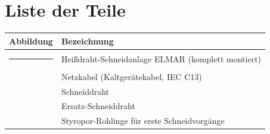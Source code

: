 %
%

\chapter{Liste der Teile}

\renewcommand{\arraystretch}{1.4}

\begin{table}[ht]
	\centering
	\begin{tabular}{|p{5cm}|p{9cm}|}
		\hline
		\textbf{Abbildung} & \textbf{Bezeichnung} \\ \hline
		
		\rule{0pt}{3cm}\centering \rule{4.5cm}{3cm}
		& Heißdraht-Schneidanlage ELMAR (komplett montiert) \\ \hline
		
		\rule{0pt}{3cm}\centering 
		& Netzkabel (Kaltgerätekabel, IEC C13) \\ \hline
		
		\rule{0pt}{3cm}\centering 
		& Schneiddraht \\ \hline
		
		\rule{0pt}{3cm}\centering  
		& Ersatz-Schneiddraht \\ \hline
		
		\rule{0pt}{3cm}\centering  
		& Styropor-Rohlinge für erste Schneidvorgänge \\ \hline
		
	\end{tabular}
\end{table}
